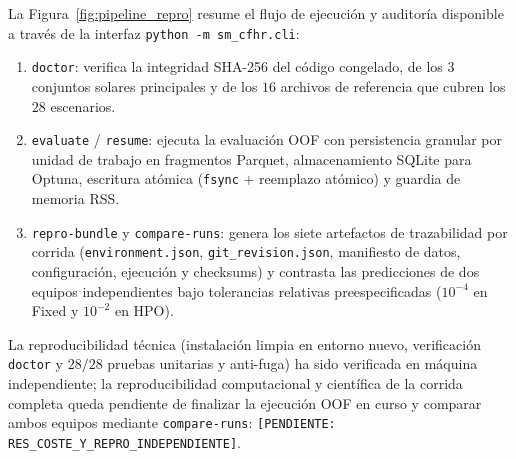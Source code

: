 La Figura~\ref{fig:pipeline_repro} resume el flujo de ejecución y auditoría disponible a través de la interfaz \texttt{python -m sm\_cfhr.cli}:
\begin{enumerate}
    \item \texttt{doctor}: verifica la integridad SHA-256 del código congelado, de los $3$ conjuntos solares principales y de los $16$ archivos de referencia que cubren los $28$ escenarios.
    \item \texttt{evaluate} / \texttt{resume}: ejecuta la evaluación OOF con persistencia granular por unidad de trabajo en fragmentos Parquet, almacenamiento SQLite para Optuna, escritura atómica (\texttt{fsync} + reemplazo atómico) y guardia de memoria RSS.
    \item \texttt{repro-bundle} y \texttt{compare-runs}: genera los siete artefactos de trazabilidad por corrida (\texttt{environment.json}, \texttt{git\_revision.json}, manifiesto de datos, configuración, ejecución y checksums) y contrasta las predicciones de dos equipos independientes bajo tolerancias relativas preespecificadas ($10^{-4}$ en Fixed y $10^{-2}$ en HPO).
\end{enumerate}
La reproducibilidad técnica (instalación limpia en entorno nuevo, verificación \texttt{doctor} y $28/28$ pruebas unitarias y anti-fuga) ha sido verificada en máquina independiente; la reproducibilidad computacional y científica de la corrida completa queda pendiente de finalizar la ejecución OOF en curso y comparar ambos equipos mediante \texttt{compare-runs}: \texttt{[PENDIENTE: RES\_COSTE\_Y\_REPRO\_INDEPENDIENTE]}.
